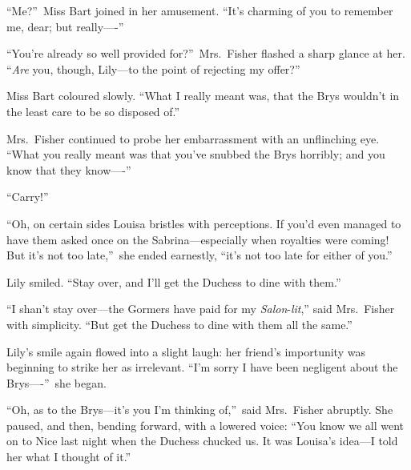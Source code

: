\documentclass[12pt,a4paper]{book}
\begin{document}
``Me?''\ Miss Bart joined in her amusement. ``It's charming of you to
remember me, dear; but really----''





``You're already so well provided for?''\ Mrs.\ Fisher flashed a
sharp glance at her. ``\textit{Are} you, though, Lily---to the point of
rejecting my offer?''





Miss Bart coloured slowly. ``What I really meant was, that the
Brys wouldn't in the least care to be so disposed of.''





Mrs.\ Fisher continued to probe her embarrassment with an
unflinching eye. ``What you really meant was that you've snubbed
the Brys horribly; and you know that they know----''





``Carry!''





``Oh, on certain sides Louisa bristles with perceptions. If you'd
even managed to have them asked once on the Sabrina---especially
when royalties were coming! But it's not too late,''\ she ended
earnestly, ``it's not too late for either of you.''





Lily smiled. ``Stay over, and I'll get the Duchess to dine with
them.''





``I shan't stay over---the Gormers have paid for my \textit{Salon}-\textit{lit},''
said Mrs.\ Fisher with simplicity. ``But get the Duchess to dine
with them all the same.''





Lily's smile again flowed into a slight laugh: her friend's
importunity was beginning to strike her as irrelevant. ``I'm sorry
I have been negligent about the Brys----''\ she began.





``Oh, as to the Brys---it's you I'm thinking of,''\ said Mrs.\ Fisher
abruptly. She paused, and then, bending forward, with a lowered
voice: ``You know we all went on to Nice last night when the
Duchess chucked us. It was Louisa's idea---I told her what I
thought of it.''
\end{document}
